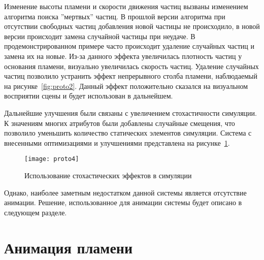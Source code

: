 Изменение высоты пламени и скорости движения частиц вызваны изменением алгоритма
поиска ''мертвых'' частиц. В прошлой версии алгоритма при отсутствии свободных
частиц добавления новой частицы не происходило, в новой версии происходит замена
случайной частицы при неудаче. В продемонстрированном примере часто происходит
удаление случайных частиц и замена их на новые. Из-за данного эффекта
увеличилась плотность частиц у основания пламени, визуально увеличилась скорость
частиц. Удаление случайных частиц позволило устранить эффект непрерывного столба
пламени, наблюдаемый на рисунке~\ref{fig:proto2}. Данный эффект положительно
сказался на визуальном восприятии сцены и будет использован в дальнейшем.

Дальнейшие улучшения были связаны с увеличением стохастичности симуляции. К
значениям многих атрибутов были добавлены случайные смещения, что позволило
уменьшить количество статических элементов симуляции. Система с внесенными
оптимизациями и улучшениями представлена на рисунке~\ref{fig:proto4}.
\begin{figure}[htb]
	\centering
    \texttt{[image: proto4]}
    \caption{Использование стохастических эффектов в симуляции}%
    \label{fig:proto4}
\end{figure}
Однако, наиболее заметным недостатком данной системы является отсутствие
анимации. Решение, использованное для анимации системы будет описано в следующем
разделе.

\section{Анимация пламени}

